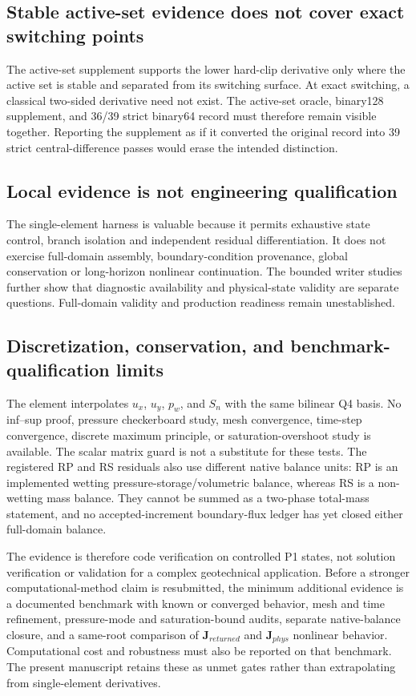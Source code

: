 \documentclass[preprint,12pt,authoryear]{elsarticle}
\begin{document}
\subsection{Stable active-set evidence does not cover exact switching points}

The active-set supplement supports the lower hard-clip derivative only where the active set is stable and separated from its switching surface. At exact switching, a classical two-sided derivative need not exist. The active-set oracle, binary128 supplement, and 36/39 strict binary64 record must therefore remain visible together. Reporting the supplement as if it converted the original record into 39 strict central-difference passes would erase the intended distinction.

\subsection{Local evidence is not engineering qualification}

The single-element harness is valuable because it permits exhaustive state control, branch isolation and independent residual differentiation. It does not exercise full-domain assembly, boundary-condition provenance, global conservation or long-horizon nonlinear continuation. The bounded writer studies further show that diagnostic availability and physical-state validity are separate questions. Full-domain validity and production readiness remain unestablished.

\subsection{Discretization, conservation, and benchmark-qualification limits}

The element interpolates $u_x$, $u_y$, $p_w$, and $S_n$ with the same bilinear Q4 basis. No inf--sup proof, pressure checkerboard study, mesh convergence, time-step convergence, discrete maximum principle, or saturation-overshoot study is available. The scalar matrix guard is not a substitute for these tests. The registered RP and RS residuals also use different native balance units: RP is an implemented wetting pressure-storage/volumetric balance, whereas RS is a non-wetting mass balance. They cannot be summed as a two-phase total-mass statement, and no accepted-increment boundary-flux ledger has yet closed either full-domain balance.

The evidence is therefore code verification on controlled P1 states, not solution verification or validation for a complex geotechnical application. Before a stronger computational-method claim is resubmitted, the minimum additional evidence is a documented benchmark with known or converged behavior, mesh and time refinement, pressure-mode and saturation-bound audits, separate native-balance closure, and a same-root comparison of $\mathbf{J}_{returned}$ and $\mathbf{J}_{phys}$ nonlinear behavior. Computational cost and robustness must also be reported on that benchmark. The present manuscript retains these as unmet gates rather than extrapolating from single-element derivatives.
\end{document}
